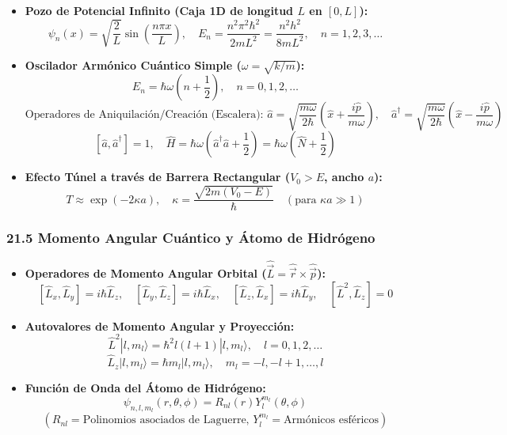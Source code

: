 \documentclass[11pt,a4paper]{article}
\begin{document}
\begin{itemize}
  \item \textbf{Pozo de Potencial Infinito (Caja 1D de longitud $L$ en $[0, L]$):}
  \[
    \psi_n(x) = \sqrt{\frac{2}{L}}\sin\left( \frac{n\pi x}{L} \right), \quad E_n = \frac{n^2 \pi^2 \hbar^2}{2m L^2} = \frac{n^2 h^2}{8m L^2}, \quad n = 1, 2, 3, \dots
  \]
  \item \textbf{Oscilador Armónico Cuántico Simple ($\omega = \sqrt{k/m}$):}
  \[
    E_n = \hbar\omega \left( n + \frac{1}{2} \right), \quad n = 0, 1, 2, \dots
  \]
  \[
    \text{Operadores de Aniquilación/Creación (Escalera): } \hat{a} = \sqrt{\frac{m\omega}{2\hbar}}\left(\hat{x} + \frac{i\hat{p}}{m\omega}\right), \quad \hat{a}^\dagger = \sqrt{\frac{m\omega}{2\hbar}}\left(\hat{x} - \frac{i\hat{p}}{m\omega}\right)
  \]
  \[
    [\hat{a}, \hat{a}^\dagger] = 1, \quad \hat{H} = \hbar\omega\left(\hat{a}^\dagger \hat{a} + \frac{1}{2}\right) = \hbar\omega\left(\hat{N} + \frac{1}{2}\right)
  \]
  \item \textbf{Efecto Túnel a través de Barrera Rectangular ($V_0 > E$, ancho $a$):}
  \[
    T \approx \exp(-2\kappa a), \quad \kappa = \frac{\sqrt{2m(V_0 - E)}}{\hbar} \quad (\text{para } \kappa a \gg 1)
  \]
\end{itemize}

\subsubsection*{21.5 Momento Angular Cuántico y Átomo de Hidrógeno}

\begin{itemize}
  \item \textbf{Operadores de Momento Angular Orbital ($\hat{\vec{L}} = \hat{\vec{r}} \times \hat{\vec{p}}$):}
  \[
    [\hat{L}_x, \hat{L}_y] = i\hbar \hat{L}_z, \quad [\hat{L}_y, \hat{L}_z] = i\hbar \hat{L}_x, \quad [\hat{L}_z, \hat{L}_x] = i\hbar \hat{L}_y, \quad [\hat{L}^2, \hat{L}_z] = 0
  \]
  \item \textbf{Autovalores de Momento Angular y Proyección:}
  \[
    \hat{L}^2 |l, m_l\rangle = \hbar^2 l(l + 1)|l, m_l\rangle, \quad l = 0, 1, 2, \dots
  \]
  \[
    \hat{L}_z |l, m_l\rangle = \hbar m_l |l, m_l\rangle, \quad m_l = -l, -l+1, \dots, l
  \]
  \item \textbf{Función de Onda del Átomo de Hidrógeno:}
  \[
    \psi_{n, l, m_l}(r, \theta, \phi) = R_{nl}(r) Y_l^{m_l}(\theta, \phi)
  \]
  \[
    (R_{nl} = \text{Polinomios asociados de Laguerre}, \, Y_l^{m_l} = \text{Armónicos esféricos})
  \]
\end{itemize}
\end{document}
